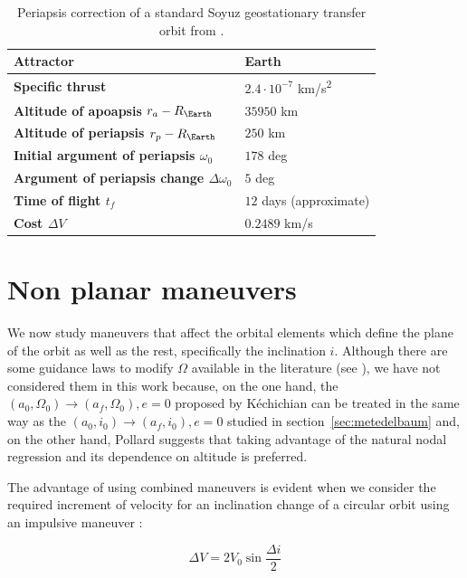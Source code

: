 \begin{table}
\centering
\begin{tabular}{|l|l|}
\hline
\textbf{Attractor}            & Earth \\ \hline
\textbf{Specific thrust}            & $2.4 \cdot 10^{-7}$ km/s\textsuperscript{2}      \\ \hline
\textbf{Altitude of apoapsis $r_a - R_{\Earth}$} & $35950$ km \\ \hline
\textbf{Altitude of periapsis $r_p - R_{\Earth}$} & $250$ km \\ \hline
\textbf{Initial argument of periapsis $\omega_0$} & $178$ deg \\ \hline
\textbf{Argument of periapsis change $\Delta \omega_0$} & $5$ deg \\ \hline
\textbf{Time of flight $t_f$} & $12$ days (approximate) \\ \hline
\textbf{Cost $\Delta V$} & $0.2489$ km/s \\ \hline
\end{tabular}
\caption{Periapsis correction of a standard Soyuz geostationary transfer orbit from \cite{ruggiero2011low}.}
\label{tab:gto}
\end{table}

\section{Non planar maneuvers} \label{sec:metnonplanar}

We now study maneuvers that affect the orbital elements which define the plane of the orbit as well as the rest, specifically the inclination $i$. Although there are some guidance laws to modify $\Omega$ available in the literature (see \cite{kechichian2010analytic,pollard1997simplified}), we have not considered them in this work because, on the one hand, the $(a_0, \Omega_0) \rightarrow (a_f, \Omega_0), e = 0$ proposed by Kéchichian can be treated in the same way as the $(a_0, i_0) \rightarrow (a_f, i_0), e = 0$ studied in section~\ref{sec:metedelbaum} and, on the other hand, Pollard suggests that taking advantage of the natural nodal regression and its dependence on altitude is preferred.

The advantage of using combined maneuvers is evident when we consider the required increment of velocity for an inclination change of a circular orbit using an impulsive maneuver \cite{vallado2001fundamentals}:

\[
\Delta V = 2 V_0 \sin \frac{\Delta i}{2}
\]

